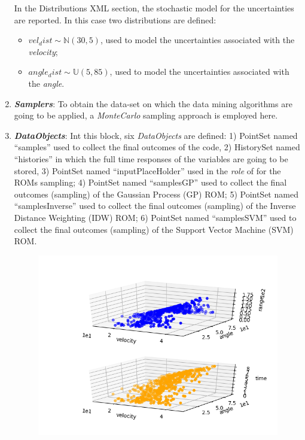 \begin{enumerate}
  In the Distributions XML section, the stochastic model for the
  uncertainties are reported. In
  this case two distributions are defined:
  \begin{itemize}
    \item $vel_dist \sim \mathbb{N}(30,5)$, used to model the uncertainties
    associated with  the \textit{velocity};
    \item  $angle_dist \sim \mathbb{U}(5,85)$,  used to
    model the uncertainties associated with the \textit{angle}.
  \end{itemize}
   \item \textbf{\textit{Samplers}}:
  To obtain the data-set on which the data mining algorithms are going to be applied, a \textit{MonteCarlo} sampling approach is employed here.
   \item \textbf{\textit{DataObjects}}:
  Int this block, six \textit{DataObjects} are defined: 1) PointSet
  named ``samples'' used to collect the final outcomes of the code, 2)
  HistorySet named ``histories'' in which the full time responses of the
  variables are going to be stored, 3) PointSet named
  ``inputPlaceHolder'' used in the \textit{role} of  for the ROMs sampling;
  4) PointSet named ``samplesGP'' used to collect the final outcomes (sampling) of the Gaussian Process (GP) ROM;
  5) PointSet named ``samplesInverse'' used to collect the final outcomes (sampling) of the Inverse Distance Weighting (IDW) ROM;
  6) PointSet named ``samplesSVM'' used to collect the final outcomes (sampling) of the Support Vector Machine (SVM) ROM.
 \begin{figure}[h!]
  \centering
  \includegraphics[scale=0.7]{../../tests/framework/user_guide/ReducedOrderModeling/gold/ROMConstruction/1-samplesPlot3D_scatter-scatter.png}

\end{figure}
\end{enumerate}
